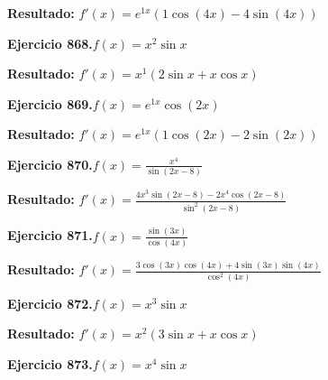 \documentclass[10pt,a4paper]{article}
\begin{document}
\begin{solbox}
\textbf{Resultado:} \(\displaystyle f'(x) = e^{1x}(1\cos(4x) - 4\sin(4x))\)
\end{solbox}

\newpage
\begin{ejbox}
\textbf{Ejercicio 868.}\quad $f(x) = x^{2} \sin x$
\end{ejbox}

\begin{solbox}
\textbf{Resultado:} \(\displaystyle f'(x) = x^{1}(2\sin x + x\cos x)\)
\end{solbox}

\begin{ejbox}
\textbf{Ejercicio 869.}\quad $f(x) = e^{1x} \cos(2x)$
\end{ejbox}

\begin{solbox}
\textbf{Resultado:} \(\displaystyle f'(x) = e^{1x}(1\cos(2x) - 2\sin(2x))\)
\end{solbox}

\begin{ejbox}
\textbf{Ejercicio 870.}\quad $f(x) = \frac{x^{4}}{\sin(2x -8)}$
\end{ejbox}

\begin{solbox}
\textbf{Resultado:} \(\displaystyle f'(x) = \frac{4x^{3}\sin(2x -8) - 2x^{4}\cos(2x -8)}{\sin^2(2x -8)}\)
\end{solbox}

\newpage
\begin{ejbox}
\textbf{Ejercicio 871.}\quad $f(x) = \frac{\sin(3x)}{\cos(4x)}$
\end{ejbox}

\begin{solbox}
\textbf{Resultado:} \(\displaystyle f'(x) = \frac{3\cos(3x)\cos(4x) + 4\sin(3x)\sin(4x)}{\cos^2(4x)}\)
\end{solbox}

\begin{ejbox}
\textbf{Ejercicio 872.}\quad $f(x) = x^{3} \sin x$
\end{ejbox}

\begin{solbox}
\textbf{Resultado:} \(\displaystyle f'(x) = x^{2}(3\sin x + x\cos x)\)
\end{solbox}

\begin{ejbox}
\textbf{Ejercicio 873.}\quad $f(x) = x^{4} \sin x$
\end{ejbox}
\end{document}
